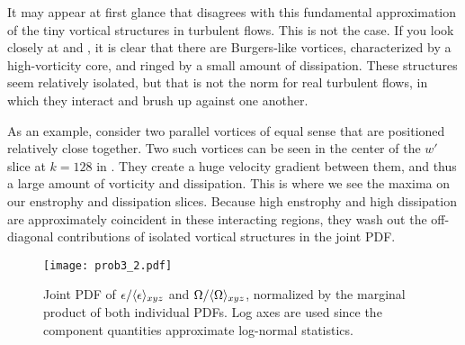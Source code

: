 \documentclass[11pt]{article}
\begin{document}
It may appear at first glance that  disagrees with this fundamental approximation of the tiny vortical structures in turbulent flows. This is not the case. If you look closely at  and , it is clear that there are Burgers-like vortices, characterized by a high-vorticity core, and ringed by a small amount of dissipation. These structures seem relatively isolated, but that is not the norm for real turbulent flows, in which they interact and brush up against one another.

As an example, consider two parallel vortices of equal sense that are positioned relatively close together. Two such vortices can be seen in the center of the $w'$ slice at $k=128$ in . They create a huge velocity gradient between them, and thus a large amount of vorticity and dissipation. This is where we see the maxima on our enstrophy and dissipation slices. Because high enstrophy and high dissipation are approximately coincident in these interacting regions, they wash out the off-diagonal contributions of isolated vortical structures in the joint PDF.

\begin{figure}[h]
\centering
\texttt{[image: prob3\_2.pdf]}
\\[6pt]
\caption{Joint PDF of $\epsilon / \langle \epsilon \rangle_{xyz}$ and $\Omega / \langle \Omega \rangle_{xyz}$, normalized by the marginal product of both individual PDFs. Log axes are used since the component quantities approximate log-normal statistics.}
\label{fig:prob_3_2_joint_pdf}
\end{figure}

\end{document}
